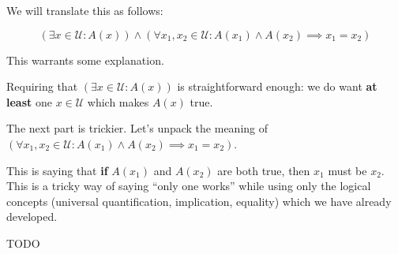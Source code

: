 We will translate this as follows:

\[
(\exists x \in \mathcal{U}: A(x)) \wedge (\forall x_1, x_2 \in \mathcal{U}: A(x_1) \wedge A(x_2) \implies x_1 = x_2  )
\]

This warrants some explanation.

Requiring that $(\exists x \in \mathcal{U}: A(x)) $ is straightforward enough:  we do want \textbf{at least} one $x \in \mathcal{U}$ which makes $A(x)$ true.

The next part is trickier.  Let's unpack the meaning of $(\forall x_1, x_2 \in \mathcal{U}: A(x_1) \wedge A(x_2) \implies x_1 = x_2  )$.

This is saying that \textbf{if} $A(x_1)$ and $A(x_2)$ are both true, then $x_1$ must be $x_2$.  This is a tricky way of saying ``only one works'' while using only the logical concepts (universal quantification, implication, equality) which we have already developed.

\begin{xca}
		TODO
	\end{xca}